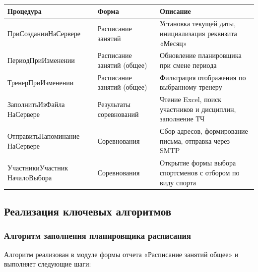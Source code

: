 \vspace{0.2cm}
\noindent
\begin{tabular}{|p{5.25cm}|p{3.5cm}|p{6.5cm}|}
	\hline
	Процедура & Форма & Описание \\
	\hline
	ПриСозданииНаСервере & Расписание занятий & Установка текущей даты, инициализация реквизита «Месяц» \\
	\hline
	ПериодПриИзменении & Расписание занятий (общее) & Обновление планировщика при смене периода \\
	\hline
	ТренерПриИзменении & Расписание занятий (общее) & Фильтрация отображения по выбранному тренеру \\
	\hline
	ЗаполнитьИзФайла НаСервере & Результаты соревнований & Чтение Excel, поиск участников и дисциплин, заполнение ТЧ \\
	\hline
	ОтправитьНапоминание НаСервере & Соревнования & Сбор адресов, формирование письма, отправка через SMTP \\
	\hline
	УчастникиУчастник НачалоВыбора & Соревнования & Открытие формы выбора спортсменов с отбором по виду спорта \\
	\hline
\end{tabular}
\vspace{0.4cm}

\subsection{Реализация ключевых алгоритмов}

\subsubsection{Алгоритм заполнения планировщика расписания}

Алгоритм реализован в модуле формы отчета «Расписание занятий общее» и выполняет следующие шаги:

